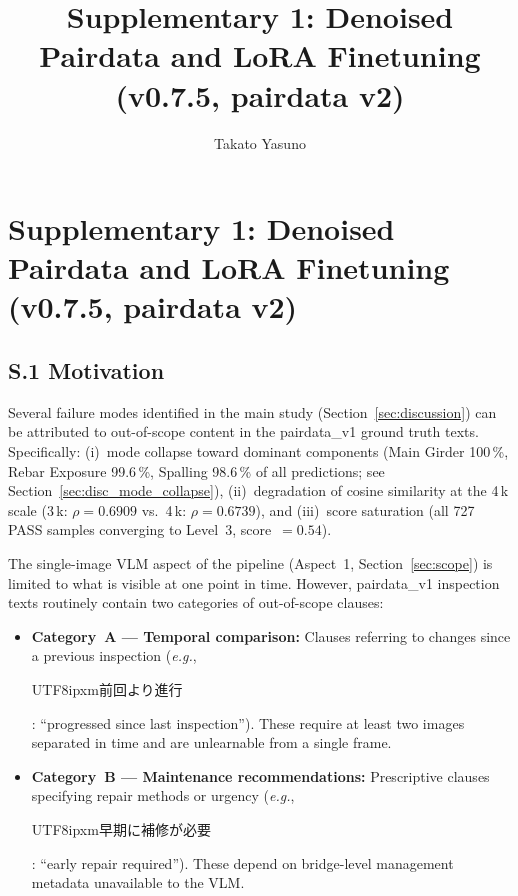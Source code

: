 ﻿\documentclass[onecolumn]{article}
\title{Supplementary 1: Denoised Pairdata and LoRA Finetuning (v0.7.5, pairdata v2)}
\author[1]{Takato Yasuno}
\date{}
\begin{document}
\renewcommand{\figurename}{Figure}
\renewcommand{\tablename}{Table}
\maketitle

\section*{Supplementary 1: Denoised Pairdata and LoRA Finetuning (v0.7.5, pairdata v2)}
\label{sec:supplementary1}

\subsection*{S.1 Motivation}

Several failure modes identified in the main study (Section~\ref{sec:discussion})
can be attributed to out-of-scope content in the pairdata\_v1 ground truth texts.
Specifically: (i)~mode collapse toward dominant components
(Main Girder 100\,\%, Rebar Exposure 99.6\,\%, Spalling 98.6\,\% of all predictions;
see Section~\ref{sec:disc_mode_collapse}),
(ii)~degradation of cosine similarity at the 4\,k scale
(3\,k: $\rho=0.6909$ vs.\ 4\,k: $\rho=0.6739$), and
(iii)~score saturation (all 727 PASS samples converging to Level~3, score~$=0.54$).

The single-image VLM aspect of the pipeline (Aspect~1, Section~\ref{sec:scope})
is limited to what is visible at one point in time.
However, pairdata\_v1 inspection texts routinely contain two categories of
out-of-scope clauses:
\begin{itemize}
  \item \textbf{Category~A ---  Temporal comparison:}
        Clauses referring to changes since a previous inspection
        (\textit{e.g.}, \begin{CJK}{UTF8}{ipxm}前回より進行\end{CJK}: ``progressed since last inspection'').
        These require at least two images separated in time and are unlearnable
        from a single frame.
  \item \textbf{Category~B --- Maintenance recommendations:}
        Prescriptive clauses specifying repair methods or urgency
        (\textit{e.g.}, \begin{CJK}{UTF8}{ipxm}早期に補修が必要\end{CJK}: ``early repair required'').
        These depend on bridge-level management metadata unavailable to the VLM.
\end{itemize}
\end{document}
